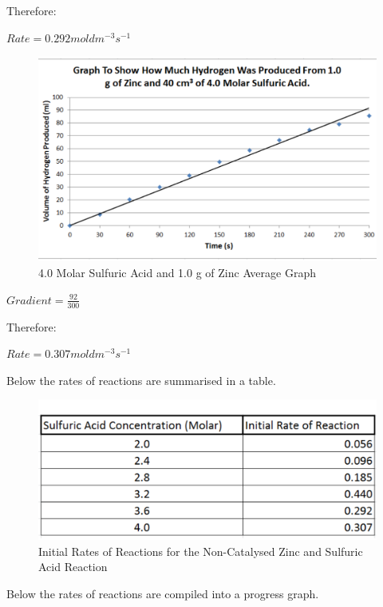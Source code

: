 Therefore:

$Rate = 0.292 mol dm^{-3} s^{-1}$

\begin{figure}[H]
    \includegraphics[width=\textwidth]{./Analysis/Images/1NonCatalyst/40Molar.pdf}
    \caption{4.0 Molar Sulfuric Acid and 1.0 g of Zinc Average Graph} \label{fig:40MolarSAGradient}
\end{figure}

$Gradient = \frac{92}{300}$

Therefore:

$Rate = 0.307 mol dm^{-3} s^{-1}$

Below the rates of reactions are summarised in a table.

\begin{figure}[H]
    \includegraphics[width=\textwidth]{./Analysis/Images/1NonCatalyst/Rates.pdf}
    \caption{Initial Rates of Reactions for the Non-Catalysed Zinc and Sulfuric Acid Reaction} \label{fig:RatesSA}
\end{figure}

Below the rates of reactions are compiled into a progress graph.

